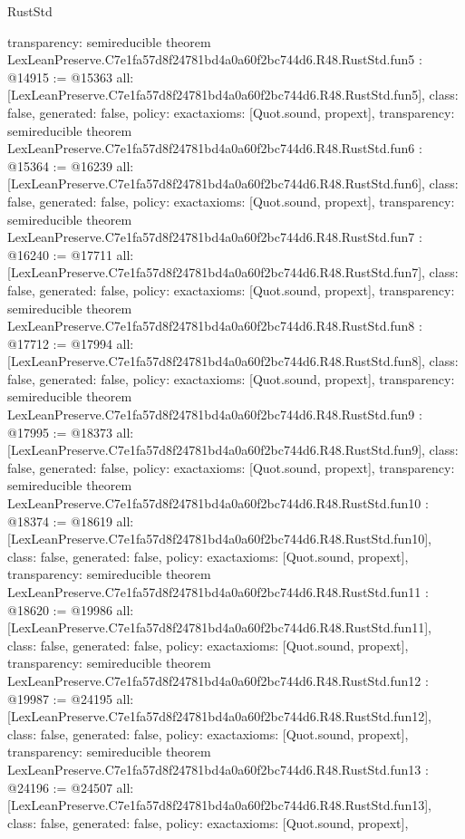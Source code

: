 \begin{lexlean}{RustStd}
\begin{coremodule}
{  transparency: semireducible
}
theorem LexLeanPreserve.C7e1fa57d8f24781bd4a0a60f2bc744d6.R48.RustStd.fun5 : @14915 := @15363 {
  all: [LexLeanPreserve.C7e1fa57d8f24781bd4a0a60f2bc744d6.R48.RustStd.fun5],
  class: false,
  generated: false,
  policy: exact{axioms: [Quot.sound, propext]},
  transparency: semireducible
}
theorem LexLeanPreserve.C7e1fa57d8f24781bd4a0a60f2bc744d6.R48.RustStd.fun6 : @15364 := @16239 {
  all: [LexLeanPreserve.C7e1fa57d8f24781bd4a0a60f2bc744d6.R48.RustStd.fun6],
  class: false,
  generated: false,
  policy: exact{axioms: [Quot.sound, propext]},
  transparency: semireducible
}
theorem LexLeanPreserve.C7e1fa57d8f24781bd4a0a60f2bc744d6.R48.RustStd.fun7 : @16240 := @17711 {
  all: [LexLeanPreserve.C7e1fa57d8f24781bd4a0a60f2bc744d6.R48.RustStd.fun7],
  class: false,
  generated: false,
  policy: exact{axioms: [Quot.sound, propext]},
  transparency: semireducible
}
theorem LexLeanPreserve.C7e1fa57d8f24781bd4a0a60f2bc744d6.R48.RustStd.fun8 : @17712 := @17994 {
  all: [LexLeanPreserve.C7e1fa57d8f24781bd4a0a60f2bc744d6.R48.RustStd.fun8],
  class: false,
  generated: false,
  policy: exact{axioms: [Quot.sound, propext]},
  transparency: semireducible
}
theorem LexLeanPreserve.C7e1fa57d8f24781bd4a0a60f2bc744d6.R48.RustStd.fun9 : @17995 := @18373 {
  all: [LexLeanPreserve.C7e1fa57d8f24781bd4a0a60f2bc744d6.R48.RustStd.fun9],
  class: false,
  generated: false,
  policy: exact{axioms: [Quot.sound, propext]},
  transparency: semireducible
}
theorem LexLeanPreserve.C7e1fa57d8f24781bd4a0a60f2bc744d6.R48.RustStd.fun10 : @18374 := @18619 {
  all: [LexLeanPreserve.C7e1fa57d8f24781bd4a0a60f2bc744d6.R48.RustStd.fun10],
  class: false,
  generated: false,
  policy: exact{axioms: [Quot.sound, propext]},
  transparency: semireducible
}
theorem LexLeanPreserve.C7e1fa57d8f24781bd4a0a60f2bc744d6.R48.RustStd.fun11 : @18620 := @19986 {
  all: [LexLeanPreserve.C7e1fa57d8f24781bd4a0a60f2bc744d6.R48.RustStd.fun11],
  class: false,
  generated: false,
  policy: exact{axioms: [Quot.sound, propext]},
  transparency: semireducible
}
theorem LexLeanPreserve.C7e1fa57d8f24781bd4a0a60f2bc744d6.R48.RustStd.fun12 : @19987 := @24195 {
  all: [LexLeanPreserve.C7e1fa57d8f24781bd4a0a60f2bc744d6.R48.RustStd.fun12],
  class: false,
  generated: false,
  policy: exact{axioms: [Quot.sound, propext]},
  transparency: semireducible
}
theorem LexLeanPreserve.C7e1fa57d8f24781bd4a0a60f2bc744d6.R48.RustStd.fun13 : @24196 := @24507 {
  all: [LexLeanPreserve.C7e1fa57d8f24781bd4a0a60f2bc744d6.R48.RustStd.fun13],
  class: false,
  generated: false,
  policy: exact{axioms: [Quot.sound, propext]},
}
\end{coremodule}
\end{lexlean}
